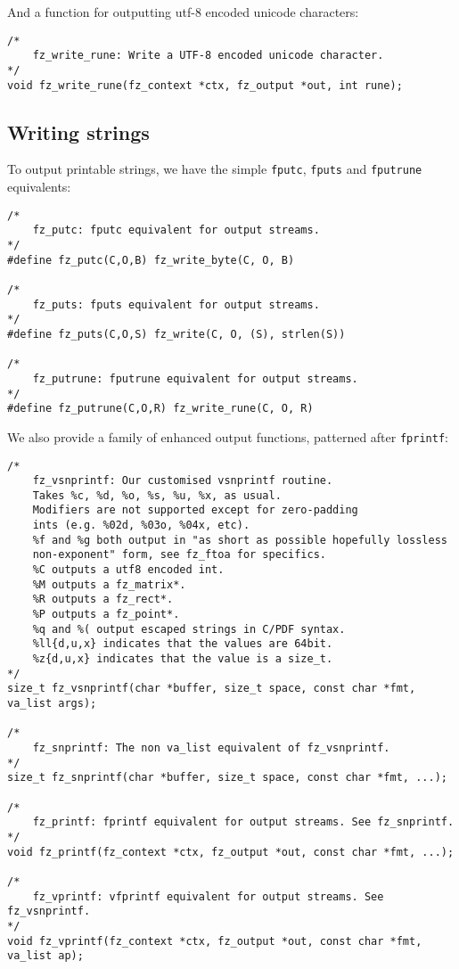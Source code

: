 \documentclass[oneside]{book}
\begin{document}
And a function for outputting utf-8 encoded unicode characters:

\begin{lstlisting}
/*
	fz_write_rune: Write a UTF-8 encoded unicode character.
*/
void fz_write_rune(fz_context *ctx, fz_output *out, int rune);
\end{lstlisting}

\subsection{Writing strings}

To output printable strings, we have the simple \texttt{fputc}, \texttt{fputs} and \texttt{fputrune} equivalents:

\begin{lstlisting}
/*
	fz_putc: fputc equivalent for output streams.
*/
#define fz_putc(C,O,B) fz_write_byte(C, O, B)

/*
	fz_puts: fputs equivalent for output streams.
*/
#define fz_puts(C,O,S) fz_write(C, O, (S), strlen(S))

/*
	fz_putrune: fputrune equivalent for output streams.
*/
#define fz_putrune(C,O,R) fz_write_rune(C, O, R)
\end{lstlisting}

We also provide a family of enhanced output functions, patterned after \texttt{fprintf}:

\begin{lstlisting}
/*
	fz_vsnprintf: Our customised vsnprintf routine.
	Takes %c, %d, %o, %s, %u, %x, as usual.
	Modifiers are not supported except for zero-padding
	ints (e.g. %02d, %03o, %04x, etc).
	%f and %g both output in "as short as possible hopefully lossless
	non-exponent" form, see fz_ftoa for specifics.
	%C outputs a utf8 encoded int.
	%M outputs a fz_matrix*.
	%R outputs a fz_rect*.
	%P outputs a fz_point*.
	%q and %( output escaped strings in C/PDF syntax.
	%ll{d,u,x} indicates that the values are 64bit.
	%z{d,u,x} indicates that the value is a size_t.
*/
size_t fz_vsnprintf(char *buffer, size_t space, const char *fmt, va_list args);

/*
	fz_snprintf: The non va_list equivalent of fz_vsnprintf.
*/
size_t fz_snprintf(char *buffer, size_t space, const char *fmt, ...);

/*
	fz_printf: fprintf equivalent for output streams. See fz_snprintf.
*/
void fz_printf(fz_context *ctx, fz_output *out, const char *fmt, ...);

/*
	fz_vprintf: vfprintf equivalent for output streams. See fz_vsnprintf.
*/
void fz_vprintf(fz_context *ctx, fz_output *out, const char *fmt, va_list ap);
\end{lstlisting}
\end{document}
